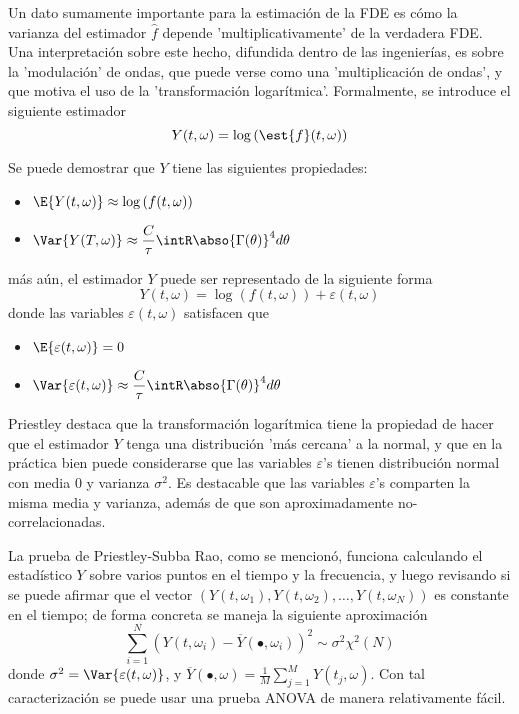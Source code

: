 Un dato sumamente importante para la estimaci\'on de la FDE es c\'omo la varianza del estimador 
$\widehat{f}$ depende 'multiplicativamente' de la verdadera FDE.
Una interpretaci\'on sobre este hecho, difundida dentro de las ingenier\'ias, es sobre la 
'modulaci\'on' de ondas, que puede verse como una 'multiplicaci\'on de ondas', y que motiva el uso 
de la 'transformaci\'on logar\'itmica'.
Formalmente, se introduce el siguiente estimador
\begin{equation*}
Y(t,\omega) = \log{\left( \est{f}(t,\omega)\right)}
\end{equation*}

Se puede demostrar que $Y$ tiene las siguientes propiedades:
\begin{itemize}
\item $\displaystyle 
\E{ Y(t,\omega) } \approx \log \left( f(t,\omega) \right)$
\item $\displaystyle 
\Var{ Y(T,\omega) } 
\approx \frac{C}{\tau} \intR \abso{\Gamma (\theta)}^{4} d\theta $
\end{itemize}
m\'as a\'un, el estimador $Y$ puede ser representado de la siguiente forma
\begin{equation*}
Y(t,\omega) = \log \left( f(t,\omega) \right) + \varepsilon(t,\omega)
\end{equation*}
donde las variables $\varepsilon(t,\omega)$ satisfacen que
\begin{itemize}
\item $\displaystyle \E{\varepsilon(t,\omega)} = 0$
\item $\displaystyle \Var{\varepsilon(t,\omega)}
\approx \frac{C}{\tau} \intR \abso{\Gamma (\theta)}^{4} d\theta$
\end{itemize}

Priestley \cite{Priestley81} destaca que la transformaci\'on logar\'itmica tiene la propiedad de 
hacer que el estimador $Y$ tenga una distribuci\'on 'm\'as cercana' a la normal, y que en la 
pr\'actica bien puede considerarse que las variables $\varepsilon$'s tienen distribuci\'on normal 
con media 0 y varianza $\sigma^{2}$.
Es destacable que las variables $\varepsilon$'s comparten la misma media y varianza, adem\'as de 
que son aproximadamente no-correlacionadas.

La prueba de Priestley-Subba Rao, como se mencion\'o, funciona calculando el estad\'istico $Y$ 
sobre varios puntos en el tiempo y la frecuencia, y luego revisando si se puede afirmar que el 
vector  $\left( Y(t,\omega_1), Y(t,\omega_2), \dots, Y(t,\omega_N) \right)$ es constante en el 
tiempo; de forma concreta  se maneja la siguiente aproximaci\'on
\begin{equation*}
\sum_{i = 1 }^{N} \left( Y(t,\omega_i) - \overline{Y}(\bullet,\omega_i) \right)^{2} 
\sim \sigma^{2} \chi^{2}(N)
\end{equation*}
donde $\sigma^{2} = \Var{\varepsilon(t,\omega)}$, y
$\overline{Y}(\bullet,\omega) = \frac{1}{M} \sum_{j=1}^{M} Y(t_j,\omega)$.
Con tal caracterizaci\'on se puede usar una prueba ANOVA de manera relativamente f\'acil.

